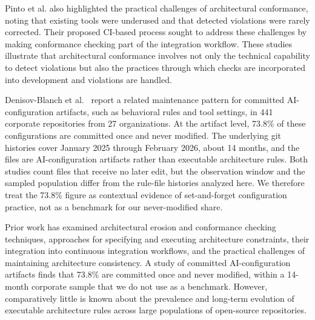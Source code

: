 Pinto et al. \cite{pinto2017} also highlighted the
practical challenges of architectural conformance, noting that
existing tools were underused and that detected violations
were rarely corrected. Their proposed CI-based process sought
to address these challenges by making conformance checking
part of the integration workflow. These studies illustrate
that architectural conformance involves not only the technical
capability to detect violations but also the practices through
which checks are incorporated into development and violations
are handled.

Denisov-Blanch et al.~\cite{denisov2026ase} report a related
maintenance pattern for committed AI-configuration artifacts,
such as behavioral rules and tool settings, in 441 corporate
repositories from 27 organizations. At the artifact level,
73.8\% of these configurations are committed once and never
modified. The underlying git histories cover January 2025
through February 2026, about 14 months, and the files are
AI-configuration artifacts rather than executable architecture
rules. Both studies count files that receive no later edit, but
the observation window and the sampled population differ from
the rule-file histories analyzed here. We therefore treat the
73.8\% figure as contextual evidence of set-and-forget
configuration practice, not as a benchmark for our
never-modified share.

\begin{tcolorbox}[
    colback=gray!5,
    colframe=black!50,
    title={Summary},
    fonttitle=\bfseries,
    boxrule=0.5pt,
    arc=1mm,
    left=2mm,
    right=2mm,
    top=1mm,
    bottom=1mm
]
Prior work has examined architectural erosion and conformance
checking techniques, approaches for specifying and executing
architecture constraints, their integration into continuous
integration workflows, and the practical challenges of
maintaining architecture consistency.
A study of committed AI-configuration artifacts finds that
73.8\% are committed once and never modified, within a
14-month corporate sample that we do not use as a benchmark.
However, comparatively little is known about the prevalence
and long-term evolution of executable architecture rules
across large populations of open-source repositories.
\end{tcolorbox}